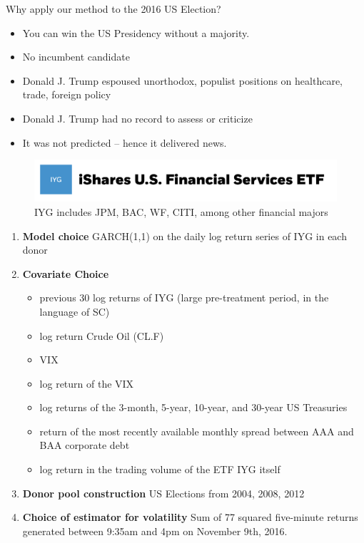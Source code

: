 \documentclass[9pt]{beamer}
\theoremstyle{definition}
\begin{document}
\begin{frame}{Why apply our method to the 2016 US Election?}

    \begin{itemize}
        \item You can win the US Presidency without a majority.
        \item No incumbent candidate
        \item Donald J. Trump espoused unorthodox, populist positions on healthcare, trade, foreign policy
        \item Donald J. Trump had no record to assess or criticize
        \item It was not predicted -- hence it delivered news.
    \end{itemize}
    
\end{frame}
\begin{frame}
    \begin{figure}[H]
        \begin{center}
          \includegraphics[scale=.2]{iyg.png}
          \caption{IYG includes JPM, BAC, WF, CITI, among other financial majors}
          \end{center}
        \end{figure}
\begin{enumerate}
    \item \textbf{Model choice} GARCH(1,1) on the daily log return series of IYG in each donor

    \item \textbf{Covariate Choice} 
    \begin{itemize}
        \item previous 30 log returns of IYG (large pre-treatment period, in the language of SC)
        \item log return Crude Oil (CL.F)
        \item VIX
        \item log return of the VIX
        \item log returns of the 3-month, 5-year, 10-year, and 30-year US Treasuries
        \item return of the most recently available monthly spread between AAA and BAA corporate debt
        \item log return in the trading volume of the ETF IYG itself
    \end{itemize}

    \item \textbf{Donor pool construction} US Elections from 2004, 2008, 2012

    \item \textbf{Choice of estimator for volatility} Sum of 77 squared five-minute returns generated between 9:35am and 4pm on November 9th, 2016.
\end{enumerate} 

\end{frame}
\end{document}
